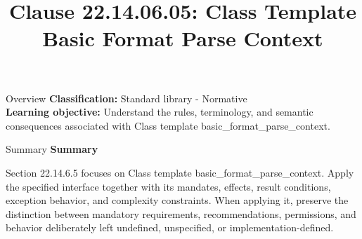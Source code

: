 \documentclass[10pt,letterpaper]{article}
\title{Clause 22.14.06.05: Class Template Basic Format Parse Context}
\author{}
\date{}
\begin{document}
\maketitle
\begin{CornellOverviewBox}{Overview}
\textbf{Classification:} Standard library - Normative\\[2pt]
\textbf{Learning objective:} Understand the rules, terminology, and semantic consequences associated with Class template basic\_format\_parse\_context.
\end{CornellOverviewBox}\begin{CornellSummaryBox}{Summary}
{\sffamily\bfseries\color{Accent} Summary}\par\vspace{3pt}Section 22.14.6.5 focuses on Class template basic\_format\_parse\_context. Apply the specified interface together with its mandates, effects, result conditions, exception behavior, and complexity constraints. When applying it, preserve the distinction between mandatory requirements, recommendations, permissions, and behavior deliberately left undefined, unspecified, or implementation-defined.
\end{CornellSummaryBox}
\end{document}
